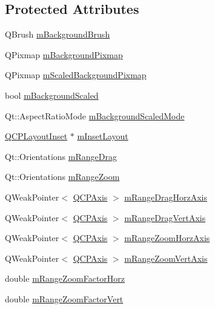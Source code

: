 \subsection*{Protected Attributes}
\begin{DoxyCompactItemize}
\item 
Q\-Brush \hyperlink{class_q_c_p_axis_rect_a5748e1a37f63c428e38b0a7724b46259}{m\-Background\-Brush}
\item 
Q\-Pixmap \hyperlink{class_q_c_p_axis_rect_a38fb1a15f43228a0c124553649303722}{m\-Background\-Pixmap}
\item 
Q\-Pixmap \hyperlink{class_q_c_p_axis_rect_aa74b9415598d59b49290e41e42d7ee27}{m\-Scaled\-Background\-Pixmap}
\item 
bool \hyperlink{class_q_c_p_axis_rect_a5ad835f0fae5d7cc5ada9e063641dbf1}{m\-Background\-Scaled}
\item 
Qt\-::\-Aspect\-Ratio\-Mode \hyperlink{class_q_c_p_axis_rect_a859fd368e794663e346b4f53f35078e9}{m\-Background\-Scaled\-Mode}
\item 
\hyperlink{class_q_c_p_layout_inset}{Q\-C\-P\-Layout\-Inset} $\ast$ \hyperlink{class_q_c_p_axis_rect_a255240399e0fd24baad80cbbe46f698a}{m\-Inset\-Layout}
\item 
Qt\-::\-Orientations \hyperlink{class_q_c_p_axis_rect_aa9f107f66ca3469ad50ee6cea7c9e237}{m\-Range\-Drag}
\item 
Qt\-::\-Orientations \hyperlink{class_q_c_p_axis_rect_a215eff671d48df2edccc36e7f976f28c}{m\-Range\-Zoom}
\item 
Q\-Weak\-Pointer$<$ \hyperlink{class_q_c_p_axis}{Q\-C\-P\-Axis} $>$ \hyperlink{class_q_c_p_axis_rect_ad968e82c00bed35250f2fa1394e2434f}{m\-Range\-Drag\-Horz\-Axis}
\item 
Q\-Weak\-Pointer$<$ \hyperlink{class_q_c_p_axis}{Q\-C\-P\-Axis} $>$ \hyperlink{class_q_c_p_axis_rect_a50a38866ae73cbec970ef89550d4df7b}{m\-Range\-Drag\-Vert\-Axis}
\item 
Q\-Weak\-Pointer$<$ \hyperlink{class_q_c_p_axis}{Q\-C\-P\-Axis} $>$ \hyperlink{class_q_c_p_axis_rect_aa1ed50c92e235aef88112ce7eef7d252}{m\-Range\-Zoom\-Horz\-Axis}
\item 
Q\-Weak\-Pointer$<$ \hyperlink{class_q_c_p_axis}{Q\-C\-P\-Axis} $>$ \hyperlink{class_q_c_p_axis_rect_a5ea4480ad5c816cc3c2eed2cd9ed1f4e}{m\-Range\-Zoom\-Vert\-Axis}
\item 
double \hyperlink{class_q_c_p_axis_rect_ad08d0250ed7b99de387d0ea6c7fd4dc1}{m\-Range\-Zoom\-Factor\-Horz}
\item 
double \hyperlink{class_q_c_p_axis_rect_a32f063629581d5bf82b12769940b34ad}{m\-Range\-Zoom\-Factor\-Vert}

\end{DoxyCompactItemize}
